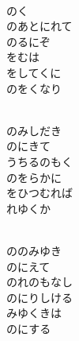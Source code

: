 \documentclass[10pt,b5j]{tarticle} %
\begin{document}
\vspace{1.5em} %
\newcommand{\linespace}{0.5em} %
\newcommand{\blocksize}{0.5\hsize} %
\newcommand{\itemmargin}{3em} %
\begin{enumerate} %
    \setlength{\itemindent}{\itemmargin} %
    \begin{minipage}[c]{\blocksize}
    
        \vspace{\linespace}
        \item~\\
        のく\\
        のあとにれて\\
        のるにぞ\\
        をむは\\
        をしてくに\\
        のをくなり
        
    \end{minipage}
    \begin{minipage}[c]{\blocksize}
        
        \vspace{\linespace}
        \item~\\
        のみしだき\\
        のにきて\\
        うちるのもく\\
        のをらかに\\
        をひつむれば\\
        れゆくか
        
    \end{minipage}
    \begin{minipage}[c]{\blocksize}
        
        \vspace{\linespace}
        \item~\\
        ののみゆき\\
        のにえて\\
        のれのもなし\\
        のにりしける\\
        みゆくきは\\
        のにする
        

\end{minipage}
\end{enumerate}
\end{document}
